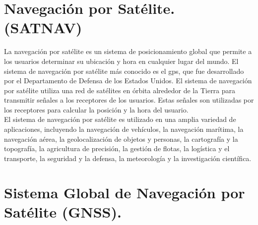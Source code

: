 \section*{\fontsize{12}{18}\selectfont Navegación por Satélite. (SATNAV)}

\begin{justify}
    La navegación por satélite es un sistema de posicionamiento global que permite a los usuarios determinar su ubicación y hora en cualquier lugar del mundo.
    El sistema de navegación por satélite más conocido es el \gls{gps}, que fue desarrollado por el Departamento de Defensa de los Estados Unidos.
    El sistema de navegación por satélite utiliza una red de satélites en órbita alrededor de la Tierra para transmitir señales a los receptores de los usuarios.
    Estas señales son utilizadas por los receptores para calcular la posición y la hora del usuario.\\

    El sistema de navegación por satélite es utilizado en una amplia variedad de aplicaciones, incluyendo la navegación de vehículos, la navegación marítima,
    la navegación aérea, la geolocalización de objetos y personas, la cartografía y la topografía, la agricultura de precisión, la gestión de flotas,
    la logística y el transporte, la seguridad y la defensa, la meteorología y la investigación científica.
\end{justify}

\section*{\fontsize{12}{18}\selectfont Sistema Global de Navegación por Satélite (GNSS).}

